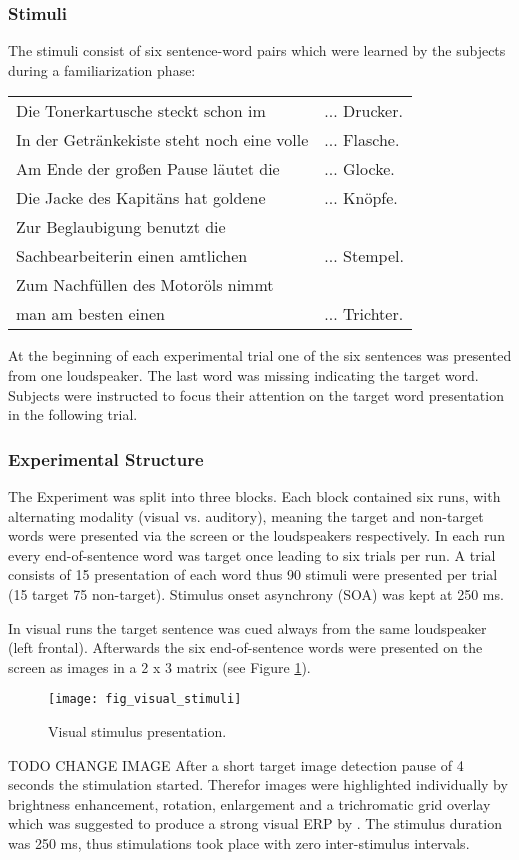 \documentclass[10pt,letterpaper]{article}
\begin{document}
\subsubsection{Stimuli}
The stimuli consist of six sentence-word pairs which were learned by the subjects during a familiarization phase:

\begin{tabular}[t]{ll}
Die Tonerkartusche steckt schon im 	& ... Drucker.\\
In der Getr\"ankekiste steht noch eine volle & ... Flasche.\\
Am Ende der großen Pause l\"autet die & ... Glocke.\\
Die Jacke des Kapit\"ans hat goldene & ... Kn\"opfe.\\
Zur Beglaubigung benutzt die \\
Sachbearbeiterin einen amtlichen	& ... Stempel.\\
Zum Nachf\"ullen des Motor\"ols nimmt\\
man am besten einen & ... Trichter.\\
\end{tabular}

At the beginning of each experimental trial one of the six sentences was presented from one loudspeaker.
The last word was missing indicating the target word.
Subjects were instructed to focus their attention on the target word presentation in the following trial.

\subsubsection{Experimental Structure}
The Experiment was split into three blocks.
Each block contained six runs, with alternating modality (visual vs. auditory), meaning the target and non-target words were presented via the screen or the loudspeakers respectively.
In each run every end-of-sentence word was target once leading to six trials per run.
A trial consists of 15 presentation of each word thus 90 stimuli were presented per trial (15 target 75 non-target).
Stimulus onset asynchrony (SOA) was kept at 250 ms.

In visual runs the target sentence was cued always from the same loudspeaker (left frontal).
Afterwards the six end-of-sentence words were presented on the screen as images in a 2 x 3 matrix (see Figure \ref{fig:visual_stimuli}).
\begin{figure}[ht]
	\texttt{[image: fig\_visual\_stimuli]}
	\caption{Visual stimulus presentation.} 
	\label{fig:visual_stimuli}
\end{figure} TODO CHANGE IMAGE
After a short target image detection pause of 4 seconds the stimulation started.
Therefor images were highlighted individually by brightness enhancement, rotation, enlargement and a trichromatic grid overlay which was suggested to produce a strong visual ERP by .
The stimulus duration was 250 ms, thus stimulations took place with zero inter-stimulus intervals.
\end{document}
